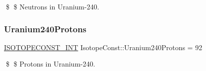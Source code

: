 \$ \$ Neutrons in Uranium-\/240. \mbox{\label{group___isotope_const-_uranium-_u240_ga1bbeb25e50c88d3e51719cf07ed38bed}} 
\subsubsection{\texorpdfstring{Uranium240\+Protons}{Uranium240Protons}}
{\footnotesize\ttfamily \mbox{\hyperlink{group___isotope_const-_macros_ga5f18360b3e99483a35c32d789e62621c}{I\+S\+O\+T\+O\+P\+E\+C\+O\+N\+S\+T\+\_\+\+I\+NT}} Isotope\+Const\+::\+Uranium240\+Protons = 92}

\$ \$ Protons in Uranium-\/240. 
